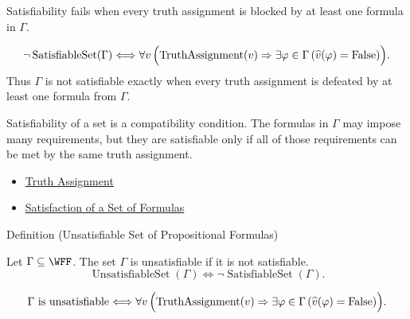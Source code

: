 \begin{remark*}
Satisfiability fails when every truth assignment is blocked by at least one
formula in \(\Gamma\).
\end{remark*}

\begin{remark*}
\[
\neg\operatorname{SatisfiableSet}(\Gamma)
\Longleftrightarrow
\forall v\,\Bigl(\operatorname{TruthAssignment}(v)\Rightarrow
\exists\varphi\in\Gamma\,(\widehat v(\varphi)=\mathrm{False})\Bigr).
\]
Thus \(\Gamma\) is not satisfiable exactly when every truth assignment is
defeated by at least one formula from \(\Gamma\).
\end{remark*}

\begin{remark*}[Interpretation]
Satisfiability of a set is a compatibility condition. The formulas in
\(\Gamma\) may impose many requirements, but they are satisfiable only if all
of those requirements can be met by the same truth assignment.
\end{remark*}

\begin{dependencies}
\begin{itemize}
  \item \hyperref[def:truth-assignment-propositional-logic]{Truth Assignment}
  \item \hyperref[def:satisfaction-set-propositional-logic]{Satisfaction of a Set of Formulas}
\end{itemize}
\end{dependencies}

\begin{definitionbox}{Definition (Unsatisfiable Set of Propositional Formulas)}
\begin{definition}
\label{def:unsatisfiable-set-of-propositional-formulas}
Let \(\Gamma\subseteq\WFF\). The set \(\Gamma\) is unsatisfiable if it is not
satisfiable.
\[
\operatorname{UnsatisfiableSet}(\Gamma)
\Longleftrightarrow
\neg\operatorname{SatisfiableSet}(\Gamma).
\]
\end{definition}
\end{definitionbox}

\begin{remark*}
\[
\Gamma\text{ is unsatisfiable}
\Longleftrightarrow
\forall v\,\Bigl(\operatorname{TruthAssignment}(v)\Rightarrow
\exists\varphi\in\Gamma\,(\widehat v(\varphi)=\mathrm{False})\Bigr).
\]
\end{remark*}


